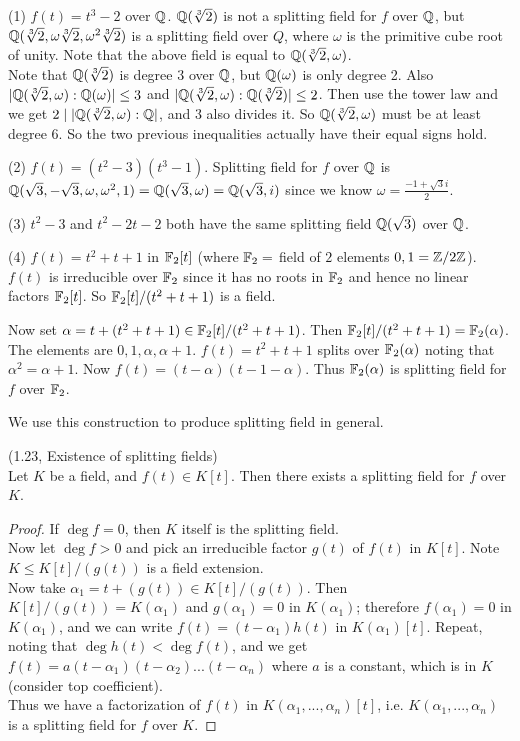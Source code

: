 \documentclass[a4paper]{article}
\begin{document}
\begin{eg}
(1) $f(t) = t^3-2$ over $\mathbb{Q}$. $\mathbb{Q}(\sqrt[3]{2})$ is not a splitting field for $f$ over $\mathbb{Q}$, but $\mathbb{Q}(\sqrt[3]{2},\omega \sqrt[3]{2},\omega^2 \sqrt[3]{2})$ is a splitting field over $Q$, where $\omega$ is the primitive cube root of unity. Note that the above field is equal to $\mathbb{Q}(\sqrt[3]{2},\omega)$.\\
Note that $\mathbb{Q}(\sqrt[3]{2})$ is degree $3$ over $\mathbb{Q}$, but $\mathbb{Q}(\omega)$ is only degree 2. Also $|\mathbb{Q}(\sqrt[3]{2},\omega):\mathbb{Q}(\omega)|\leq 3$ and $|\mathbb{Q}(\sqrt[3]{2},\omega) : \mathbb{Q}(\sqrt[3]{2})| \leq 2$. Then use the tower law and we get $2 \mid |\mathbb{Q}(\sqrt[3]{2},\omega):\mathbb{Q}|$, and $3$ also divides it. So $\mathbb{Q}(\sqrt[3]{2},\omega)$ must be at least degree 6. So the two previous inequalities actually have their equal signs hold.

(2) $f(t) = (t^2-3)(t^3-1)$. Splitting field for $f$ over $\mathbb{Q}$ is $\mathbb{Q}(\sqrt{3},-\sqrt{3},\omega,\omega^2,1) = \mathbb{Q}(\sqrt{3},\omega) = \mathbb{Q}(\sqrt{3},i)$ since we know $\omega = \frac{-1+\sqrt{3}i}{2}$.

(3) $t^2-3$ and $t^2-2t-2$ both have the same splitting field $\mathbb{Q}(\sqrt{3})$ over $\mathbb{Q}$.

(4) $f(t) = t^2+t+1$ in $\mathbb{F}_2[t]$ (where $\mathbb{F}_2 =$ field of $2$ elements $0,1 = \mathbb{Z} / 2\mathbb{Z}$). $f(t)$ is irreducible over $\mathbb{F}_2$ since it has no roots in $\mathbb{F}_2$ and hence no linear factors $\mathbb{F}_2[t]$. So $\mathbb{F}_2[t] / (t^2+t+1)$ is a field.

Now set $\alpha = t+(t^2+t+1) \in \mathbb{F}_2[t] / (t^2+t+1)$. Then $\mathbb{F}_2[t] / (t^2+t+1) = \mathbb{F}_2(\alpha)$. The elements are $0,1,\alpha,\alpha+1$. $f(t) =t^2+t+1$ splits over $\mathbb{F}_2(\alpha)$  noting that $\alpha^2 = \alpha+1$. Now $f(t) = (t-\alpha)(t-1-\alpha)$. Thus $\mathbb{F}_2(\alpha)$ is splitting field for $f$ over $\mathbb{F}_2$.
\end{eg}

We use this construction to produce splitting field in general.

\begin{thm} (1.23, Existence of splitting fields)\\
Let $K$ be a field, and $f(t) \in K[t]$. Then there exists a splitting field for $f$ over $K$.
\begin{proof}
If $\deg f = 0$, then $K$ itself is the splitting field.\\
Now let $\deg f >0$ and pick an irreducible factor $g(t)$ of $f(t)$ in $K[t]$. Note $K \leq K[t] / (g(t))$ is a field extension.\\
Now take $\alpha_1 = t+(g(t)) \in K[t] / (g(t))$. Then $K[t] / (g(t)) = K(\alpha_1)$ and $g(\alpha_1) = 0$ in $K(\alpha_1)$; therefore $f(\alpha_1) = 0$ in $K(\alpha_1)$, and we can write $f(t) = (t-\alpha_1) h(t)$ in $K(\alpha_1)[t]$. Repeat, noting that $\deg h(t) < \deg f(t)$, and we get $f(t) = a(t-\alpha_1) (t-\alpha_2) ... (t-\alpha_n)$ where $a$ is a constant, which is in $K$ (consider top coefficient).\\
Thus we have a factorization of $f(t)$ in $K(\alpha_1,...,\alpha_n)[t]$, i.e. $K(\alpha_1,...,\alpha_n)$ is a splitting field for $f$ over $K$.
\end{proof}
\end{thm}
\end{document}
